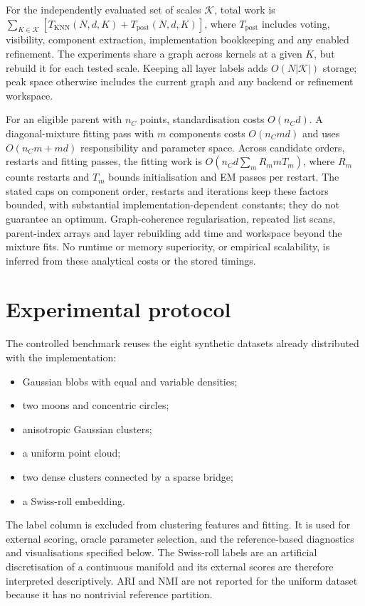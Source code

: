 \documentclass[pdflatex,sn-basic,Numbered]{sn-jnl}
\begin{document}
For the independently evaluated set of scales $\mathcal K$, total work is
$\sum_{K\in\mathcal K}[T_{\mathrm{KNN}}(N,d,K)+T_{\mathrm{post}}(N,d,K)]$,
where $T_{\mathrm{post}}$ includes voting, visibility, component extraction,
implementation bookkeeping and any enabled refinement. The experiments share
a graph across kernels at a given $K$, but rebuild it for each tested scale.
Keeping all layer labels adds $O(N|\mathcal K|)$ storage; peak space otherwise
includes the current graph and any backend or refinement workspace.

For an eligible parent with $n_C$ points, standardisation costs $O(n_Cd)$.
A diagonal-mixture fitting pass with $m$ components costs $O(n_Cmd)$ and uses
$O(n_Cm+md)$ responsibility and parameter space. Across candidate orders,
restarts and fitting passes, the fitting work is
$O(n_Cd\sum_m R_m m T_m)$, where $R_m$ counts restarts and $T_m$ bounds
initialisation and EM passes per restart. The stated caps on component order,
restarts and iterations keep these factors bounded, with substantial
implementation-dependent constants; they do not guarantee an optimum.
Graph-coherence regularisation, repeated list scans, parent-index arrays and
layer rebuilding add time and workspace beyond the mixture fits. No runtime
or memory superiority, or empirical scalability, is inferred from these
analytical costs or the stored timings.

\section{Experimental protocol}\label{sec:experimental_protocol}

The controlled benchmark reuses the eight synthetic datasets already distributed with the implementation:
\begin{itemize}
    \item Gaussian blobs with equal and variable densities;
    \item two moons and concentric circles;
    \item anisotropic Gaussian clusters;
    \item a uniform point cloud;
    \item two dense clusters connected by a sparse bridge;
    \item a Swiss-roll embedding.
\end{itemize}
The label column is excluded from clustering features and fitting. It is used for external scoring, oracle parameter selection, and the reference-based diagnostics and visualisations specified below. The Swiss-roll labels are an artificial discretisation of a continuous manifold and its external scores are therefore interpreted descriptively. ARI and NMI are not reported for the uniform dataset because it has no nontrivial reference partition.
\end{document}
